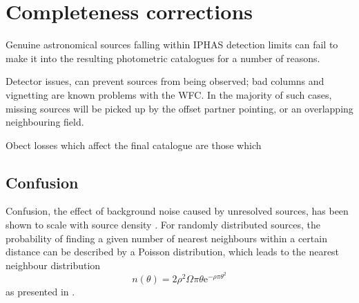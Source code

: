 \documentclass[a4paper,useAMS,usenatbib]{mn2e}
\begin{document}



\section[]{Completeness corrections} 
\label{sec:completeness}

Genuine astronomical sources falling within IPHAS detection limits can fail to
make it into the resulting photometric catalogues for a number of reasons.

Detector issues, can prevent sources from being observed; bad columns and
vignetting are known problems with the WFC. In the majority of such cases,
missing sources will be picked up by the offset partner pointing, or an overlapping neighbouring field.

Obect losses which affect the final catalogue are those which

\subsection{Confusion}

Confusion, the effect of background noise caused by unresolved sources, has been shown to scale with source density \citep{Condon1974}. For randomly distributed sources, the probability of finding a given number of nearest neighbours within a certain distance can be described by a Poisson distribution, which leads to the nearest neighbour distribution 
\begin{equation}
n(\theta) = 2\rho^2\Omega\pi\theta\mathrm{e}^{-\rho\pi\theta^2}
\label{eq:theoretical_neighbours}
\end{equation}
\noindent as presented in \citet{Bahcall1986}.
\end{document}
